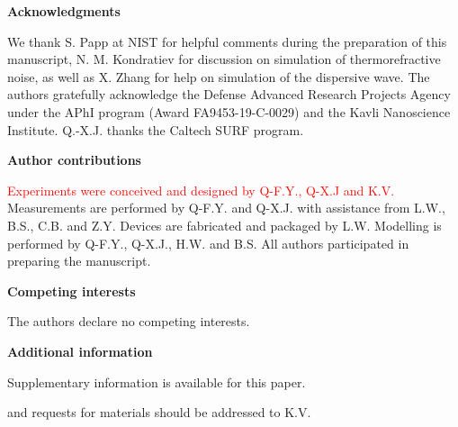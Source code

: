 \documentclass[noshowpacs,amsmath,
twocolumn,
superscriptaddress,
8pt,
aps,prb]{revtex4-2}
\begin{document}
\noindent\textbf{Acknowledgments}

\begin{footnotesize}
\noindent We thank S. Papp at NIST for helpful comments during the preparation of this manuscript, N. M. Kondratiev for discussion on simulation of thermorefractive noise, as well as X. Zhang for help on simulation of the dispersive wave. The authors gratefully acknowledge the Defense Advanced Research Projects Agency under the APhI program (Award FA9453-19-C-0029) and the Kavli Nanoscience Institute. Q.-X.J. thanks the Caltech SURF program.
\end{footnotesize}

\medskip

\noindent\textbf{Author contributions} 

\begin{footnotesize}
\noindent \textcolor{red}{Experiments were conceived and designed by Q-F.Y., Q-X.J and K.V.} Measurements are performed by Q-F.Y. and Q-X.J. with assistance from L.W., B.S., C.B. and Z.Y. Devices are fabricated and packaged by L.W. Modelling is performed by Q-F.Y., Q-X.J., H.W. and B.S. All authors participated in preparing the manuscript.
\end{footnotesize}

\medskip

\noindent\textbf{Competing interests}

\begin{footnotesize}
\noindent The authors declare no competing interests.
\end{footnotesize}

\medskip

\noindent\textbf{Additional information}

\begin{footnotesize}
\noindent Supplementary information is available for this paper.

\medskip

 and requests for materials should be addressed to K.V.
\end{footnotesize}

\newpage
\end{document}
